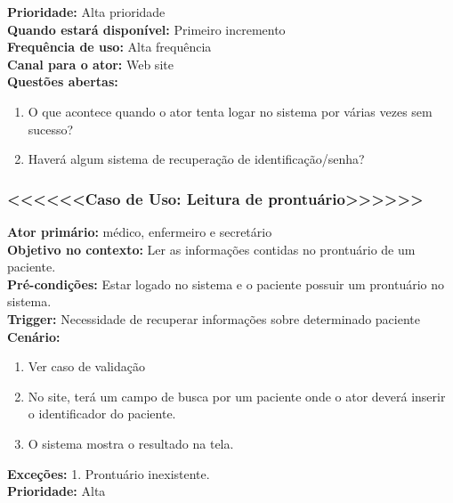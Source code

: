 \documentclass[12pt,a4paper]{report}
\begin{document}
\textbf{Prioridade:} Alta prioridade\\

\textbf{Quando estará disponível:} Primeiro incremento\\

\textbf{Frequência de uso:} Alta frequência\\

\textbf{Canal para o ator:} Web site\\

\textbf{Questões abertas:}
\begin{enumerate}
\item O que acontece quando o ator tenta logar no sistema por várias vezes sem sucesso?
\item Haverá algum sistema de recuperação de identificação/senha?\\
\end{enumerate}



\subsubsection{<<<<<<Caso de Uso: Leitura de prontuário>>>>>>}

\textbf{Ator primário:} médico, enfermeiro e secretário\\

\textbf{Objetivo no contexto:} Ler as informações contidas no prontuário de um paciente.\\

\textbf{Pré-condições:} Estar logado no sistema e o paciente possuir um prontuário no sistema.\\

\textbf{Trigger:} Necessidade de recuperar informações sobre determinado paciente\\

\textbf{Cenário:}
\begin{enumerate}
\item Ver caso de validação
\item No site, terá um campo de busca por um paciente onde o ator deverá inserir o identificador do paciente.
\item O sistema mostra o resultado na tela.

\end{enumerate}

\textbf{Exceções:}
1. Prontuário inexistente.\\

\textbf{Prioridade:} Alta\\
\end{document}
